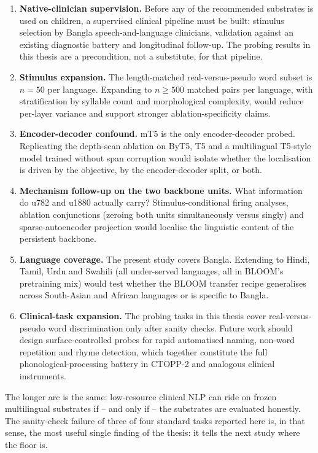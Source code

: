 \begin{enumerate}
    \item \textbf{Native-clinician supervision.} Before any of the recommended substrates is used on children, a supervised clinical pipeline must be built: stimulus selection by Bangla speech-and-language clinicians, validation against an existing diagnostic battery and longitudinal follow-up. The probing results in this thesis are a precondition, not a substitute, for that pipeline.

    \item \textbf{Stimulus expansion.} The length-matched real-versus-pseudo word subset is $n = 50$ per language. Expanding to $n \geq 500$ matched pairs per language, with stratification by syllable count and morphological complexity, would reduce per-layer variance and support stronger ablation-specificity claims.

    \item \textbf{Encoder-decoder confound.} mT5 is the only encoder-decoder probed. Replicating the depth-scan ablation on ByT5, T5 and a multilingual T5-style model trained without span corruption would isolate whether the localisation is driven by the objective, by the encoder-decoder split, or both.

    \item \textbf{Mechanism follow-up on the two backbone units.} What information do u782 and u1880 actually carry? Stimulus-conditional firing analyses, ablation conjunctions (zeroing both units simultaneously versus singly) and sparse-autoencoder projection would localise the linguistic content of the persistent backbone.

    \item \textbf{Language coverage.} The present study covers Bangla. Extending to Hindi, Tamil, Urdu and Swahili (all under-served languages, all in BLOOM's pretraining mix) would test whether the BLOOM transfer recipe generalises across South-Asian and African languages or is specific to Bangla.

    \item \textbf{Clinical-task expansion.} The probing tasks in this thesis cover real-versus-pseudo word discrimination only after sanity checks. Future work should design surface-controlled probes for rapid automatised naming, non-word repetition and rhyme detection, which together constitute the full phonological-processing battery in CTOPP-2 and analogous clinical instruments.
\end{enumerate}

The longer arc is the same: low-resource clinical NLP can ride on frozen multilingual substrates if -- and only if -- the substrates are evaluated honestly. The sanity-check failure of three of four standard tasks reported here is, in that sense, the most useful single finding of the thesis: it tells the next study where the floor is.
